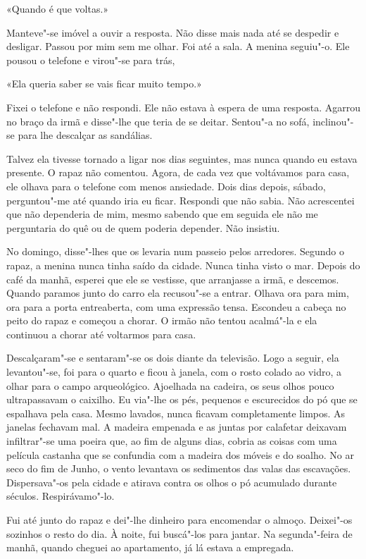 «Quando é que voltas.»

Manteve"-se imóvel a ouvir a resposta. Não disse mais nada até se
despedir e desligar. Passou por mim sem me olhar. Foi até a sala. A
menina seguiu"-o. Ele pousou o telefone e virou"-se para trás,

«Ela queria saber se vais ficar muito tempo.»

Fixei o telefone e não respondi. Ele não estava à espera de uma
resposta. Agarrou no braço da irmã e disse"-lhe que teria de se deitar.
Sentou"-a no sofá, inclinou"-se para lhe descalçar as sandálias.

Talvez ela tivesse tornado a ligar nos dias seguintes, mas nunca quando
eu estava presente. O rapaz não comentou. Agora, de cada vez que
voltávamos para casa, ele olhava para o telefone com menos ansiedade.
Dois dias depois, sábado, perguntou"-me até quando iria eu ficar.
Respondi que não sabia. Não acrescentei que não dependeria de mim, mesmo
sabendo que em seguida ele não me perguntaria do quê ou de quem poderia
depender. Não insistiu.

No domingo, disse"-lhes que os levaria num passeio pelos arredores.
Segundo o rapaz, a menina nunca tinha saído da cidade. Nunca tinha visto
o mar. Depois do café da manhã, esperei que ele se vestisse, que
arranjasse a irmã, e descemos. Quando paramos junto do carro ela
recusou"-se a entrar. Olhava ora para mim, ora para a porta entreaberta,
com uma expressão tensa. Escondeu a cabeça no peito do rapaz e começou a
chorar. O irmão não tentou acalmá"-la e ela continuou a chorar até
voltarmos para casa.

Descalçaram"-se e sentaram"-se os dois diante da televisão. Logo a
seguir, ela levantou"-se, foi para o quarto e ficou à janela, com o
rosto colado ao vidro, a olhar para o campo arqueológico. Ajoelhada na
cadeira, os seus olhos pouco ultrapassavam o caixilho. Eu via"-lhe os
pés, pequenos e escurecidos do pó que se espalhava pela casa. Mesmo
lavados, nunca ficavam completamente limpos. As janelas fechavam mal. A
madeira empenada e as juntas por calafetar deixavam infiltrar"-se uma
poeira que, ao fim de alguns dias, cobria as coisas com uma película
castanha que se confundia com a madeira dos móveis e do soalho. No ar
seco do fim de Junho, o vento levantava os sedimentos das valas das
escavações. Dispersava"-os pela cidade e atirava contra os olhos o pó
acumulado durante séculos. Respirávamo"-lo.

Fui até junto do rapaz e dei"-lhe dinheiro para encomendar o almoço.
Deixei"-os sozinhos o resto do dia. À noite, fui buscá"-los para jantar.
Na segunda"-feira de manhã, quando cheguei ao apartamento, já lá estava
a empregada.

